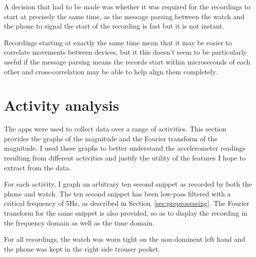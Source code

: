       A decision that had to be made was whether it was required for the recordings to start at precisely the same time, as the message parsing between the watch and the phone to signal the start of the recording is fast but it is not instant. 
      
      Recordings starting at exactly the same time mean that it may be easier to correlate movements between devices, but it this doesn't seem to be particularly useful if the message parsing means the records start within microseconds of each other and cross-correlation may be able to help align them completely.  
      
  \section{Activity analysis}
    \label{sec:activity-details}
    The apps were used to collect data over a range of activities. This section provides the graphs of the magnitude and the Fourier transform of the magnitude. I used these graphs to better understand the accelerometer readings resulting from different activities and justify the utility of the features I hope to extract from the data.
    
    For each activity, I graph an arbitrary ten second snippet as recorded by both the phone and watch. The ten second snippet has been low-pass filtered with a critical frequency of 5Hz, as described in Section~\ref{sec:preprocessing}. The Fourier transform for the same snippet is also provided, so as to display the recording in the frequency domain as well as the time domain.
    
    For all recordings, the watch was worn tight on the non-dominent left hand and the phone was kept in the right side trouser pocket.
    
